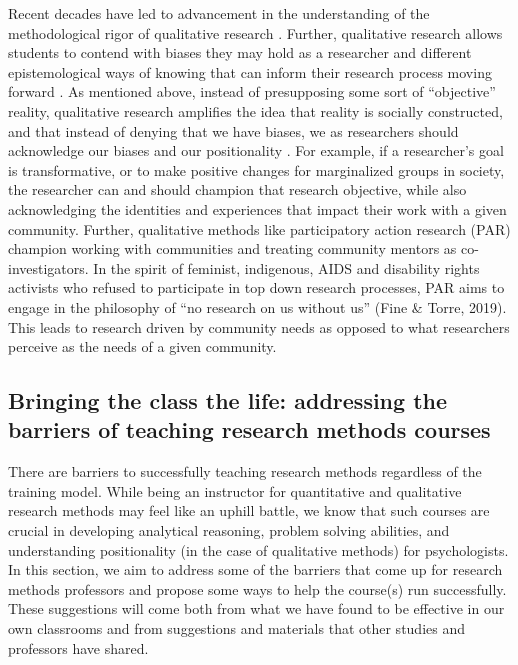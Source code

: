 \documentclass[
  11pt,
]{book}
\begin{document}
Recent decades have led to advancement in the understanding of the methodological rigor of qualitative research \citep{levitt_teaching_2013}. Further, qualitative research allows students to contend with biases they may hold as a researcher and different epistemological ways of knowing that can inform their research process moving forward \citep{levitt_teaching_2013, ponterotto_qualitative_2005}. As mentioned above, instead of presupposing some sort of ``objective'' reality, qualitative research amplifies the idea that reality is socially constructed, and that instead of denying that we have biases, we as researchers should acknowledge our biases and our positionality \citep{creswell_qualitative_2016}. For example, if a researcher's goal is transformative, or to make positive changes for marginalized groups in society, the researcher can and should champion that research objective, while also acknowledging the identities and experiences that impact their work with a given community. Further, qualitative methods like participatory action research (PAR) champion working with communities and treating community mentors as co-investigators. In the spirit of feminist, indigenous, AIDS and disability rights activists who refused to participate in top down research processes, PAR aims to engage in the philosophy of ``no research on us without us'' (Fine \& Torre, 2019). This leads to research driven by community needs as opposed to what researchers perceive as the needs of a given community.

\subsection{Bringing the class the life: addressing the barriers of teaching research methods courses}\label{bringing-the-class-the-life-addressing-the-barriers-of-teaching-research-methods-courses}

There are barriers to successfully teaching research methods regardless of the training model. While being an instructor for quantitative and qualitative research methods may feel like an uphill battle, we know that such courses are crucial in developing analytical reasoning, problem solving abilities, and understanding positionality (in the case of qualitative methods) for psychologists. In this section, we aim to address some of the barriers that come up for research methods professors and propose some ways to help the course(s) run successfully. These suggestions will come both from what we have found to be effective in our own classrooms and from suggestions and materials that other studies and professors have shared.
\end{document}
